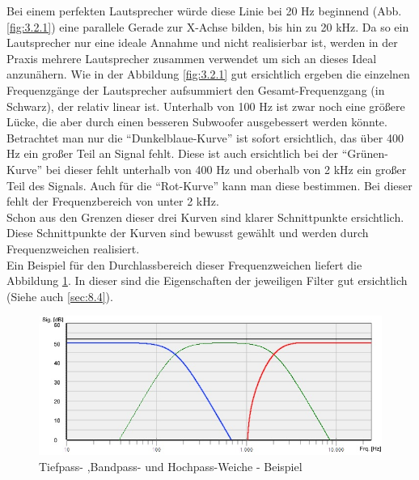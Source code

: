 Bei einem perfekten Lautsprecher würde diese Linie bei 20 Hz beginnend (Abb. \ref{fig:3.2.1}) eine parallele Gerade zur X-Achse bilden, bis hin zu 20 kHz.
Da so ein Lautsprecher nur eine ideale Annahme und nicht realisierbar ist, werden in der Praxis mehrere Lautsprecher zusammen verwendet um sich an dieses Ideal anzunähern.
Wie in der Abbildung \ref{fig:3.2.1} gut ersichtlich ergeben die einzelnen Frequenzgänge der Lautsprecher aufsummiert den Gesamt-Frequenzgang (in Schwarz), der relativ linear ist.
Unterhalb von 100 Hz ist zwar noch eine größere Lücke, die aber durch einen besseren Subwoofer ausgebessert werden könnte.\\
Betrachtet man nur die \enquote{Dunkelblaue-Kurve} ist sofort ersichtlich, das über 400 Hz ein großer Teil an Signal fehlt.
Diese ist auch ersichtlich bei der \enquote{Grünen-Kurve} bei dieser fehlt unterhalb von 400 Hz und oberhalb von 2 kHz ein großer Teil des Signals.
Auch für die \enquote{Rot-Kurve} kann man diese bestimmen.
Bei dieser fehlt der Frequenzbereich von unter 2 kHz.\\
Schon aus den Grenzen dieser drei Kurven sind klarer Schnittpunkte ersichtlich.
Diese Schnittpunkte der Kurven sind bewusst gewählt und werden durch Frequenzweichen realisiert.
\\
Ein Beispiel für den Durchlassbereich dieser Frequenzweichen liefert die Abbildung \ref{fig:3.2.2}.
In dieser sind die Eigenschaften der jeweiligen Filter gut ersichtlich (Siehe auch \ref{sec:8.4}).
\begin{figure} [H]
	\centering
	\includegraphics[width=1\textwidth]{img/Grundlagen/Mehrweg-Lautsprechersysteme/Frequenzbereiche-Audio-Weiche-cut.jpg}
	\caption{Tiefpass- ,Bandpass- und Hochpass-Weiche - Beispiel}
	\label{fig:3.2.2}
\end{figure}

